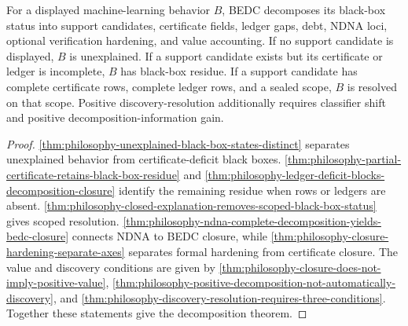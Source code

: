 \begin{theorem}
\label{thm:philosophy-bedc-decomposition-machine-learning-black-boxes}
For a displayed machine-learning behavior $B$, BEDC decomposes its
black-box status into support candidates, certificate fields, ledger
gaps, debt, NDNA loci, optional verification hardening, and value
accounting. If no support candidate is displayed, $B$ is unexplained. If
a support candidate exists but its certificate or ledger is incomplete,
$B$ has black-box residue. If a support candidate has complete
certificate rows, complete ledger rows, and a sealed scope, $B$ is
resolved on that scope. Positive discovery-resolution additionally
requires classifier shift and positive decomposition-information gain.
\end{theorem}
\begin{proof}
\autoref{thm:philosophy-unexplained-black-box-states-distinct}
separates unexplained behavior from certificate-deficit black boxes.
\autoref{thm:philosophy-partial-certificate-retains-black-box-residue}
and
\autoref{thm:philosophy-ledger-deficit-blocks-decomposition-closure}
identify the remaining residue when rows or ledgers are absent.
\autoref{thm:philosophy-closed-explanation-removes-scoped-black-box-status}
gives scoped resolution.
\autoref{thm:philosophy-ndna-complete-decomposition-yields-bedc-closure}
connects NDNA to BEDC closure, while
\autoref{thm:philosophy-closure-hardening-separate-axes} separates
formal hardening from certificate closure. The value and discovery
conditions are given by
\autoref{thm:philosophy-closure-does-not-imply-positive-value},
\autoref{thm:philosophy-positive-decomposition-not-automatically-discovery},
and
\autoref{thm:philosophy-discovery-resolution-requires-three-conditions}.
Together these statements give the decomposition theorem.
\end{proof}

